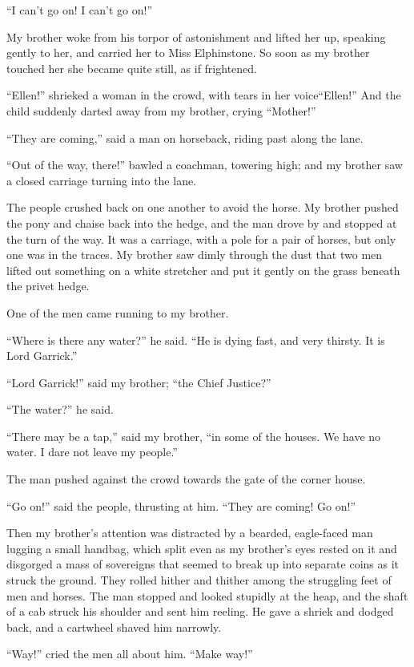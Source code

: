 ``I can't go on! I can't go on!''

My brother woke from his torpor of astonishment and lifted her up,
speaking gently to her, and carried her to Miss Elphinstone. So
soon as my brother touched her she became quite still, as if
frightened.

``Ellen!'' shrieked a woman in the crowd, with tears in her
voice\dash{}``Ellen!'' And the child suddenly darted away from my brother,
crying ``Mother!''

``They are coming,'' said a man on horseback, riding past along the
lane.

``Out of the way, there!'' bawled a coachman, towering high; and my
brother saw a closed carriage turning into the lane.

The people crushed back on one another to avoid the horse. My
brother pushed the pony and chaise back into the hedge, and the man
drove by and stopped at the turn of the way. It was a carriage,
with a pole for a pair of horses, but only one was in the traces.
My brother saw dimly through the dust that two men lifted out
something on a white stretcher and put it gently on the grass
beneath the privet hedge.

One of the men came running to my brother.

``Where is there any water?'' he said. ``He is dying fast, and very
thirsty. It is Lord Garrick.''

``Lord Garrick!'' said my brother; ``the Chief Justice?''

``The water?'' he said.

``There may be a tap,'' said my brother, ``in some of the houses. We
have no water. I dare not leave my people.''

The man pushed against the crowd towards the gate of the corner
house.

``Go on!'' said the people, thrusting at him. ``They are coming! Go
on!''

Then my brother's attention was distracted by a bearded,
eagle-faced man lugging a small handbag, which split even as my
brother's eyes rested on it and disgorged a mass of sovereigns that
seemed to break up into separate coins as it struck the ground.
They rolled hither and thither among the struggling feet of men and
horses. The man stopped and looked stupidly at the heap, and the
shaft of a cab struck his shoulder and sent him reeling. He gave a
shriek and dodged back, and a cartwheel shaved him narrowly.

``Way!'' cried the men all about him. ``Make way!''

